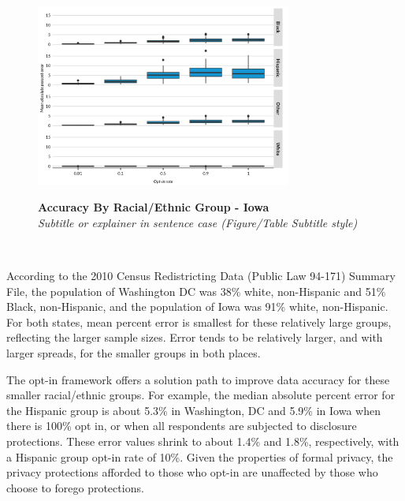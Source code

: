 \documentclass[
]{urban-formatting}
\begin{document}
\begin{figure}[htbp]
    \caption{
    \textbf{Accuracy By Racial/Ethnic Group - Iowa}\\
    \textit{Subtitle or explainer in sentence case (Figure/Table Subtitle style)}
    }
    \centering
    \includegraphics[width=0.75\textwidth]{../analysis/figures/dec-race-accuracy-ia.png}
    \label{fig:dec-race-accuracy-ia}
\end{figure}
\begin{singlespace}
    \\
\end{singlespace}

According to the 2010 Census Redistricting Data (Public Law 94-171)
Summary File, the population of Washington DC was 38\% white,
non-Hispanic and 51\% Black, non-Hispanic, and the population of Iowa
was 91\% white, non-Hispanic. For both states, mean percent error is
smallest for these relatively large groups, reflecting the larger sample
sizes. Error tends to be relatively larger, and with larger spreads, for
the smaller groups in both places.

The opt-in framework offers a solution path to improve data accuracy for
these smaller racial/ethnic groups. For example, the median absolute
percent error for the Hispanic group is about 5.3\% in Washington, DC
and 5.9\% in Iowa when there is 100\% opt in, or when all respondents
are subjected to disclosure protections. These error values shrink to
about 1.4\% and 1.8\%, respectively, with a Hispanic group opt-in rate
of 10\%. Given the properties of formal privacy, the privacy protections
afforded to those who opt-in are unaffected by those who choose to
forego protections.
\end{document}
